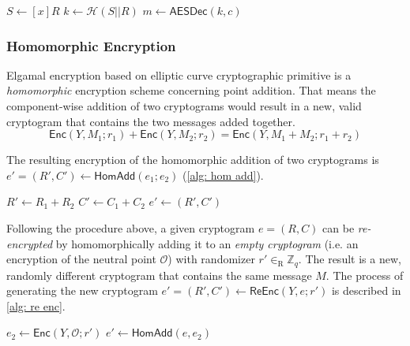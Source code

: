 \begin{algorithm}[ht]
    \DontPrintSemicolon
    \caption{$\mathsf{TxtDec} (x, e)$}
    
    $S \gets [x]R$ \;
    $k \gets \mathcal{H} (S || R)$ \;
    $m \gets \mathsf{AESDec} (k, c)$ \;
     
    
    \label{alg: txt dec}
\end{algorithm}


\subsubsection{Homomorphic Encryption}
Elgamal encryption based on elliptic curve cryptographic primitive is a \textit{homomorphic} encryption scheme concerning point addition. That means the component-wise addition of two cryptograms would result in a new, valid cryptogram that contains the two messages added together.
\[
\mathsf{Enc}(Y, M_1; r_1) + \mathsf{Enc}(Y, M_2; r_2) = \mathsf{Enc}(Y, M_1 + M_2; r_1 + r_2)
\]

The resulting encryption of the homomorphic addition of two cryptograms is $e' = (R', C') \gets \mathsf{HomAdd} (e_1; e_2)$ (\cref{alg: hom add}).

\begin{algorithm}[ht]
    \DontPrintSemicolon
    \caption{$\mathsf{HomAdd}(e_1; e_2)$}
    
    $R' \gets R_1 + R_2$ \;
    $C' \gets C_1 + C_2$ \;
    $e' \gets (R', C')$\;
     
    
    \label{alg: hom add}
\end{algorithm}

Following the procedure above, a given cryptogram $e = (R, C)$ can be \textit{re-encrypted} by homomorphically adding it to an \textit{empty cryptogram} (i.e. an encryption of the neutral point $\mathcal{O}$) with randomizer $r' \in_\mathrm{R} \mathbb{Z}_q$. The result is a new, randomly different cryptogram that contains the same message $M$. The process of generating the new cryptogram $e' = (R', C') \gets \mathsf{ReEnc} (Y, e; r')$ is described in \cref{alg: re enc}.

\begin{algorithm}[ht]
    \DontPrintSemicolon
    \caption{$\mathsf{ReEnc} (Y, e; r')$}
    
    $e_2 \gets \mathsf{Enc}(Y, \mathcal{O}; r')$ 
    $e' \gets \mathsf{HomAdd} (e, e_2)$ 
     
    
    \label{alg: re enc}
\end{algorithm}

